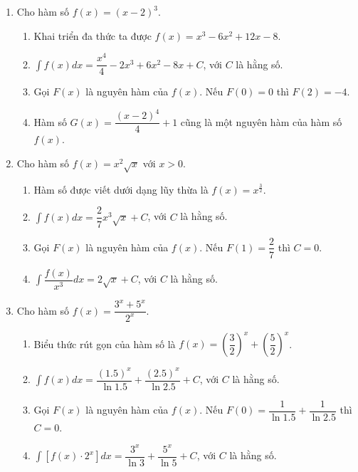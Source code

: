 \documentclass[12pt]{article}
\begin{document}
\begin{enumerate}[label=\textbf{Câu \arabic*.}, start=1]
		\item Cho hàm số $f(x) = (x - 2)^3$.
		\begin{enumerate}[label=\alph*)]
			\item Khai triển đa thức ta được $f(x) = x^3 - 6x^2 + 12x - 8$.
			\item $\displaystyle \int f(x) dx = \dfrac{x^4}{4} - 2x^3 + 6x^2 - 8x + C$, với $C$ là hằng số.
			\item Gọi $F(x)$ là nguyên hàm của $f(x)$. Nếu $F(0) = 0$ thì $F(2) = -4$.
			\item Hàm số $G(x) = \dfrac{(x-2)^4}{4} + 1$ cũng là một nguyên hàm của hàm số $f(x)$.
		\end{enumerate}
		
		\item Cho hàm số $f(x) = x^2 \sqrt{x}$ với $x > 0$.
		\begin{enumerate}[label=\alph*)]
			\item Hàm số được viết dưới dạng lũy thừa là $f(x) = x^{\frac{3}{2}}$.
			\item $\displaystyle \int f(x) dx = \dfrac{2}{7} x^3\sqrt{x} + C$, với $C$ là hằng số.
			\item Gọi $F(x)$ là nguyên hàm của $f(x)$. Nếu $F(1) = \dfrac{2}{7}$ thì $C = 0$.
			\item $\displaystyle \int \dfrac{f(x)}{x^3} dx = 2\sqrt{x} + C$, với $C$ là hằng số.
		\end{enumerate}
		
		\item Cho hàm số $f(x) = \dfrac{3^x + 5^x}{2^x}$.
		\begin{enumerate}[label=\alph*)]
			\item Biểu thức rút gọn của hàm số là $f(x) = \left(\dfrac{3}{2}\right)^x + \left(\dfrac{5}{2}\right)^x$.
			\item $\displaystyle \int f(x) dx = \dfrac{(1.5)^x}{\ln 1.5} + \dfrac{(2.5)^x}{\ln 2.5} + C$, với $C$ là hằng số.
			\item Gọi $F(x)$ là nguyên hàm của $f(x)$. Nếu $F(0) = \dfrac{1}{\ln 1.5} + \dfrac{1}{\ln 2.5}$ thì $C = 0$.
			\item $\displaystyle \int [f(x) \cdot 2^x] dx = \dfrac{3^x}{\ln 3} + \dfrac{5^x}{\ln 5} + C$, với $C$ là hằng số.
		\end{enumerate}
		

\end{enumerate}
\end{document}
